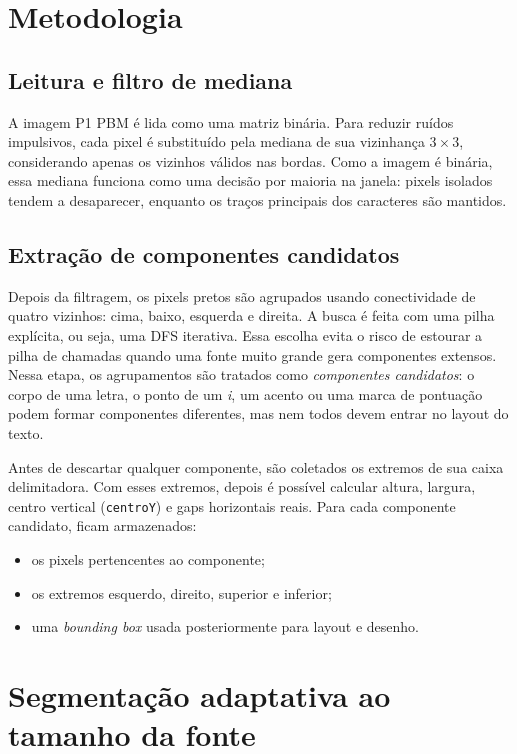 \documentclass[12pt,a4paper]{article}
\begin{document}
\section{Metodologia}

\subsection{Leitura e filtro de mediana}

A imagem P1 PBM é lida como uma matriz binária. Para reduzir ruídos impulsivos, cada pixel é substituído pela mediana de sua vizinhança $3 \times 3$, considerando apenas os vizinhos válidos nas bordas. Como a imagem é binária, essa mediana funciona como uma decisão por maioria na janela: pixels isolados tendem a desaparecer, enquanto os traços principais dos caracteres são mantidos.

\subsection{Extração de componentes candidatos}

Depois da filtragem, os pixels pretos são agrupados usando conectividade de quatro vizinhos: cima, baixo, esquerda e direita. A busca é feita com uma pilha explícita, ou seja, uma DFS iterativa. Essa escolha evita o risco de estourar a pilha de chamadas quando uma fonte muito grande gera componentes extensos. Nessa etapa, os agrupamentos são tratados como \emph{componentes candidatos}: o corpo de uma letra, o ponto de um \textit{i}, um acento ou uma marca de pontuação podem formar componentes diferentes, mas nem todos devem entrar no layout do texto.

Antes de descartar qualquer componente, são coletados os extremos de sua caixa delimitadora. Com esses extremos, depois é possível calcular altura, largura, centro vertical (\texttt{centroY}) e gaps horizontais reais. Para cada componente candidato, ficam armazenados:

\begin{itemize}
  \item os pixels pertencentes ao componente;
  \item os extremos esquerdo, direito, superior e inferior;
  \item uma \textit{bounding box} usada posteriormente para layout e desenho.
\end{itemize}

\section{Segmentação adaptativa ao tamanho da fonte}
\end{document}
